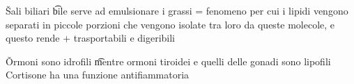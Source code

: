 \documentclass[12pt]{article}
\begin{document}
\v

Sali biliari \t bile serve ad emulsionare i grassi = fenomeno per cui i lipidi vengono separati in piccole porzioni che vengono isolate tra loro da queste molecole, e questo rende + trasportabili e digeribili

\v

Ormoni sono idrofili \t mentre ormoni tiroidei e quelli delle gonadi sono lipofili \\
Cortisone ha una funzione antifiammatoria
\end{document}
